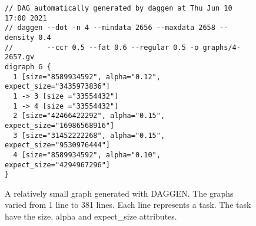 \begin{figure}[htp!]
    \centering
    \begin{Verbatim}[frame=single]
// DAG automatically generated by daggen at Thu Jun 10 17:00 2021
// daggen --dot -n 4 --mindata 2656 --maxdata 2658 --density 0.4
//        --ccr 0.5 --fat 0.6 --regular 0.5 -o graphs/4-2657.gv
digraph G {
  1 [size="8589934592", alpha="0.12", expect_size="3435973836"]
  1 -> 3 [size ="33554432"]
  1 -> 4 [size ="33554432"]
  2 [size="42466422292", alpha="0.15", expect_size="16986568916"]
  3 [size="31452222268", alpha="0.15", expect_size="9530976444"]
  4 [size="8589934592", alpha="0.10", expect_size="4294967296"]
}
    \end{Verbatim}
    \caption{A relatively small graph generated with DAGGEN. The graphs varied
    from 1 line to 381 lines. Each line represents a task. The task have the
    size, alpha and expect\_size attributes.}
    \label{fig:dag}
\end{figure}
